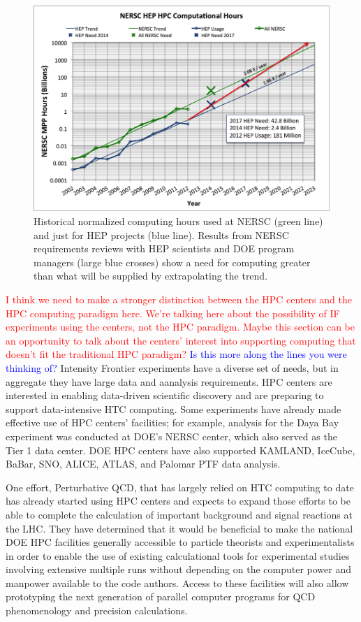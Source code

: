 \begin{figure}[h]
\includegraphics[width=\textwidth]{CpF-I2/images/2013-NERSC-Usage-HEP.png}
\caption{Historical normalized computing hours used at NERSC (green line) and just for HEP projects (blue line). Results from NERSC requirements reviews with HEP scientists and DOE program managers (large blue crosses) show a need for computing greater than what will be supplied by extrapolating the trend.}
\label{fig:NERSC-Computational-Hours}
\end{figure}

\textcolor{red}{I think we need to make a stronger distinction between the HPC centers and the HPC computing paradigm here.  We're talking here about the possibility of IF experiments using the centers, not the HPC paradigm.  Maybe this section can be an opportunity to talk about the centers' interest into supporting computing that doesn't fit the traditional HPC paradigm?}
\textcolor{blue}{Is this more along the lines you were thinking of?}
Intensity Frontier experiments have a diverse set of needs, but in aggregate 
they have large data and aanalysis requirements. HPC centers are interested in 
enabling data-driven scientific discovery and are preparing to support data-intensive HTC
computing. Some experiments have already made effective use of HPC centers' facilities; 
for example, analysis for the Daya Bay experiment was conducted at DOE's NERSC center, which also 
served as the Tier 1 data center.  DOE HPC centers have also supported KAMLAND, IceCube, BaBar, 
SNO, ALICE, ATLAS, and Palomar PTF data analysis.  

One effort, Perturbative QCD,  that has largely relied on HTC computing to date has already started using HPC centers and expects to 
expand those efforts to be able to complete the calculation of important background and signal reactions at the
LHC.  
They have determined that it would be beneficial to make the national DOE HPC
facilities 
generally accessible to particle theorists and
experimentalists in order to enable the use of existing
calculational tools for experimental studies involving extensive
multiple runs without depending on the computer power and manpower
available to the code authors. Access to these facilities will also
allow prototyping the next generation of parallel computer programs
for QCD phenomenology and precision calculations.


